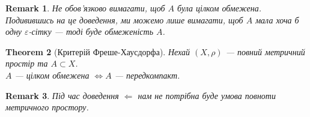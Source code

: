 \documentclass[a4paper, 10pt]{article}
\def\leftproof{$\boxed{\Leftarrow}$ }
\theoremstyle{theoremdd}
\newtheorem{theorem}{Theorem}[subsection]
\theoremstyle{theoremdd}
\theoremstyle{theoremdd}
\theoremstyle{theoremdd}
\theoremstyle{theoremdd}
\theoremstyle{theoremdd}
\newtheorem{remark}[theorem]{Remark}
\theoremstyle{theoremdd}
\theoremstyle{theoremdd}
\begin{document}
\begin{remark}
Не обов'язково вимагати, щоб $A$ була цілком обмежена. Подивившись на це доведення, ми можемо лише вимагати, щоб $A$ мала хоча б одну $\varepsilon$-сітку --- тоді буде обмеженість $A$.
\end{remark}

\begin{theorem}[Критерій Фреше-Хаусдорфа]
Нехай $(X,\rho)$ --- повний метричний простір та $A \subset X$.\\
$A$ --- цілком обмежена $\iff A$ --- передкомпакт.
\end{theorem}

\begin{remark}
Під час доведення \leftproof нам не потрібна буде умова повноти метричного простору.
\end{remark}
\end{document}
